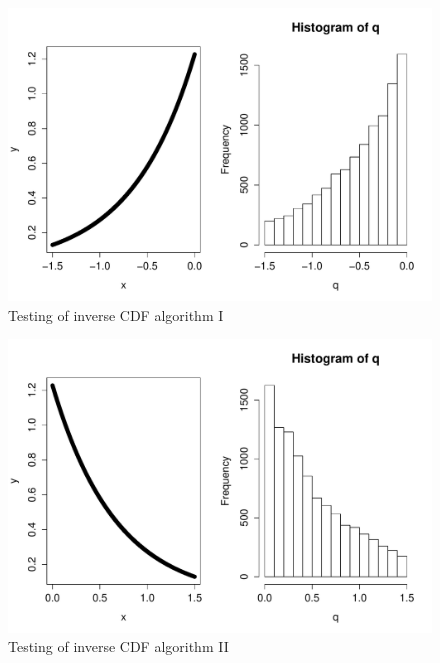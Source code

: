 \documentclass[11pt, oneside]{article}   	%
\begin{document}
\begin{figure}[htbp!]
\clearpage
  \centering
  \caption{ Testing of inverse CDF algorithm I}
    \includegraphics[width=.73\textwidth]{inverse_CDF_1}
\end{figure}

\begin{figure}[htbp!]
\clearpage
 \centering
 \caption{ Testing of inverse CDF algorithm II}
   \includegraphics[width=.73\textwidth]{inverse_CDF_2}
\end{figure}
\end{document}
